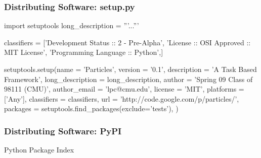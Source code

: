\begin{frame}[fragile]
\frametitle{Distributing Software: setup.py}
\begin{python}
import setuptools
long_description = '''...'''

classifiers = ['Development Status :: 2 - Pre-Alpha',
'License :: OSI Approved :: MIT License',
'Programming Language :: Python',]

setuptools.setup(name = 'Particles', version = '0.1',
      description = 'A Task Based Framework',
      long_description = long_description,
      author = 'Spring 09 Class of 98111 (CMU)',
      author_email = 'lpc@cmu.edu',
      license = 'MIT', platforms = ['Any'],
      classifiers = classifiers,
      url = 'http://code.google.com/p/particles/',
      packages = setuptools.find_packages(exclude='tests'),
      )

\end{python}
\end{frame}

\begin{frame}[fragile]
\frametitle{Distributing Software: PyPI}

Python Package Index

\end{frame}


